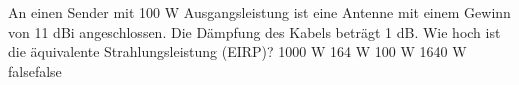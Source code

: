     {An einen Sender mit 100 W Ausgangsleistung ist eine Antenne mit einem Gewinn von 11 dBi angeschlossen. Die Dämpfung des Kabels beträgt 1 dB. Wie hoch ist die äquivalente Strahlungsleistung (EIRP)?}
    {1000 W}
    {164 W}
    {100 W}
    {1640 W}
    {false}{false}